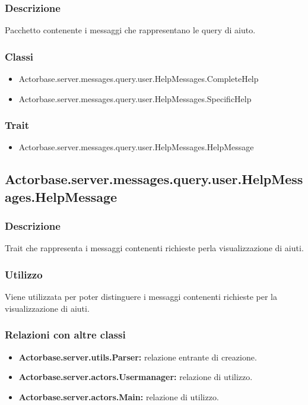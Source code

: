 \documentclass[a4paper]{article}
\begin{document}
			\subsubsection{Descrizione}
				Pacchetto contenente i messaggi che rappresentano le query di aiuto.				
				
			\subsubsection{Classi}
				\begin{itemize}
					\item Actorbase.server.messages.query.user.HelpMessages.CompleteHelp
					\item Actorbase.server.messages.query.user.HelpMessages.SpecificHelp
				\end{itemize}
				
			\subsubsection{Trait}
				\begin{itemize}
					\item Actorbase.server.messages.query.user.HelpMessages.HelpMessage
				\end{itemize}
		
		\subsection{Actorbase.server.messages.query.user.HelpMessages.HelpMessage}
			\subsubsection{Descrizione}
				Trait che rappresenta i messaggi contenenti richieste perla visualizzazione di aiuti.
				
			\subsubsection{Utilizzo}
				Viene utilizzata per poter distinguere i messaggi contenenti richieste per la visualizzazione di aiuti.
			\subsubsection{Relazioni con altre classi}
				\begin{itemize}
					\item \textbf{Actorbase.server.utils.Parser:} relazione entrante di creazione.
					\item \textbf{Actorbase.server.actors.Usermanager:} relazione di utilizzo.
					\item \textbf{Actorbase.server.actors.Main:} relazione di utilizzo.
				\end{itemize}
\end{document}
